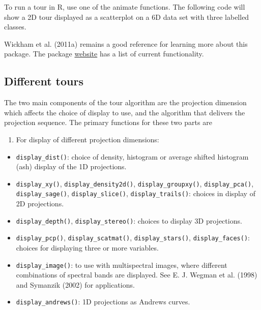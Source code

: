 \documentclass[
  letterpaper,
]{krantz}
\newenvironment{Shaded}{\begin{snugshade}}{\end{snugshade}}
\newcommand{\AttributeTok}[1]{\textcolor[rgb]{0.40,0.45,0.13}{#1}}
\newcommand{\DecValTok}[1]{\textcolor[rgb]{0.68,0.00,0.00}{#1}}
\newcommand{\FunctionTok}[1]{\textcolor[rgb]{0.28,0.35,0.67}{#1}}
\newcommand{\NormalTok}[1]{\textcolor[rgb]{0.00,0.23,0.31}{#1}}
\newcommand{\SpecialCharTok}[1]{\textcolor[rgb]{0.37,0.37,0.37}{#1}}
\providecommand{\tightlist}{%
  \setlength{\itemsep}{0pt}\setlength{\parskip}{0pt}}\usepackage{longtable,booktabs,array}
\begin{document}
To run a tour in R, use one of the animate functions. The following code
will show a 2D tour displayed as a scatterplot on a 6D data set with
three labelled classes.

\begin{Shaded}
\end{Shaded}

Wickham et al. (2011a) remains a good reference for learning more about
this package. The package \href{http://ggobi.github.io/tourr/}{website}
has a list of current functionality.

\subsection{Different tours}\label{different-tours}

The two main components of the tour algorithm are the projection
dimension which affects the choice of display to use, and the algorithm
that delivers the projection sequence. The primary functions for these
two parts are

\begin{enumerate}
\def\labelenumi{\arabic{enumi}.}
\tightlist
\item
  For display of different projection dimensions:
\end{enumerate}

\begin{itemize}
\tightlist
\item
  \texttt{display\_dist()}: choice of density, histogram or average
  shifted histogram (ash) display of the 1D projections.
\item
  \texttt{display\_xy()}, \texttt{display\_density2d()},
  \texttt{display\_groupxy()}, \texttt{display\_pca()},
  \texttt{display\_sage()}, \texttt{display\_slice()},
  \texttt{display\_trails()}: choices in display of 2D projections.
\item
  \texttt{display\_depth()}, \texttt{display\_stereo()}: choices to
  display 3D projections.
\item
  \texttt{display\_pcp()}, \texttt{display\_scatmat()},
  \texttt{display\_stars()}, \texttt{display\_faces()}: choices for
  displaying three or more variables.
\item
  \texttt{display\_image()}: to use with multispectral images, where
  different combinations of spectral bands are displayed. See E. J.
  Wegman et al. (1998) and Symanzik (2002) for applications.
\item
  \texttt{display\_andrews()}: 1D projections as Andrews curves.
\end{itemize}
\end{document}
